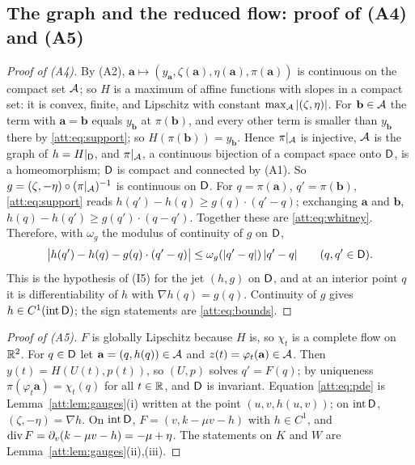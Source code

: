 \subsection{The graph and the reduced flow: proof of (A4) and (A5)}\label{att:sec:graph}
\begin{proof}[Proof of (A4)]
By (A2), $\mathbf a\mapsto(y_{\mathbf a},\zeta(\mathbf a),\eta(\mathbf a),\pi(\mathbf a))$ is continuous on the compact set $\mathcal A$; so $H$ is a maximum of affine functions with slopes in a compact set: it is convex, finite, and Lipschitz with constant $\max_\mathcal A|(\zeta,\eta)|$. For $\mathbf b\in\mathcal A$ the term with $\mathbf a=\mathbf b$ equals $y_{\mathbf b}$ at $\pi(\mathbf b)$, and every other term is smaller than $y_{\mathbf b}$ there by \eqref{att:eq:support}; so $H(\pi(\mathbf b))=y_{\mathbf b}$. Hence $\pi|_\mathcal A$ is injective, $\mathcal A$ is the graph of $h=H|_{\mathsf D}$, and $\pi|_\mathcal A$, a continuous bijection of a compact space onto $\mathsf D$, is a homeomorphism; $\mathsf D$ is compact and connected by (A1). So $g=(\zeta,-\eta)\circ(\pi|_\mathcal A)^{-1}$ is continuous on $\mathsf D$. For $q=\pi(\mathbf a)$, $q'=\pi(\mathbf b)$, \eqref{att:eq:support} reads $h(q')-h(q)\ge g(q)\cdot(q'-q)$; exchanging $\mathbf a$ and $\mathbf b$, $h(q)-h(q')\ge g(q')\cdot(q-q')$. Together these are \eqref{att:eq:whitney}. Therefore, with $\omega_g$ the modulus of continuity of $g$ on $\mathsf D$,
\begin{equation}\label{att:eq:jet}
\bigl|h(q')-h(q)-g(q)\cdot(q'-q)\bigr|\le\omega_g(|q'-q|)\,|q'-q|\qquad(q,q'\in\mathsf D).
\end{equation}
This is the hypothesis of (I5) for the jet $(h,g)$ on $\mathsf D$, and at an interior point $q$ it is differentiability of $h$ with $\nabla h(q)=g(q)$. Continuity of $g$ gives $h\in C^1(\operatorname{int}\mathsf D)$; the sign statements are \eqref{att:eq:bounds}.
\end{proof}
\begin{proof}[Proof of (A5)]
$F$ is globally Lipschitz because $H$ is, so $\chi_t$ is a complete flow on $\mathbb R^2$. For $q\in\mathsf D$ let $\mathbf a=(q,h(q))\in\mathcal A$ and $z(t)=\varphi_t(\mathbf a)\in\mathcal A$. Then $y(t)=H(U(t),p(t))$, so $(U,p)$ solves $q'=F(q)$; by uniqueness $\pi(\varphi_t\mathbf a)=\chi_t(q)$ for all $t\in\mathbb R$, and $\mathsf D$ is invariant. Equation \eqref{att:eq:pde} is Lemma~\ref{att:lem:gauges}(i) written at the point $(u,v,h(u,v))$; on $\operatorname{int}\mathsf D$, $(\zeta,-\eta)=\nabla h$. On $\operatorname{int}\mathsf D$, $F=(v,k-\mu v-h)$ with $h\in C^1$, and $\operatorname{div} F=\partial_v(k-\mu v-h)=-\mu+\eta$. The statements on $K$ and $W$ are Lemma~\ref{att:lem:gauges}(ii),(iii).
\end{proof}

